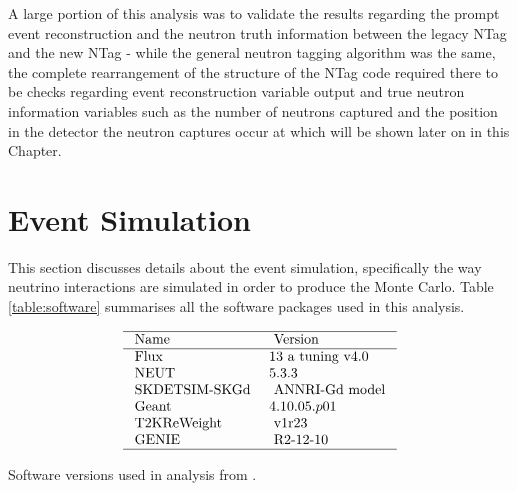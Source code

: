 A large portion of this analysis was to validate the results regarding the prompt event reconstruction and the neutron truth information between the legacy NTag and the new NTag - while the general neutron tagging algorithm was the same, the complete rearrangement of the structure of the NTag code required there to be checks regarding event reconstruction variable output and true neutron information variables such as the number of neutrons captured and the position in the detector the neutron captures occur at which will be shown later on in this Chapter. 

\section{Event Simulation}

This section discusses details about the event simulation, specifically the way neutrino interactions are simulated in order to produce the Monte Carlo. Table \ref{table:software} summarises all the software packages used in this analysis. 


\begin{table}
$$
\begin{array}{ll}
\hline \text { Name } & \text { Version } \\
\hline \text { Flux } & 13 \text { a tuning v4.0 } \\
\text { NEUT } & 5.3 .3 \\
\text { SKDETSIM-SKGd } & \text { ANNRI-Gd model } \\
\text { Geant } & 4.10.05.p01 \\
\text { T2KReWeight } & \text { v1r23 } \\
\text { GENIE } & \text { R2-12-10 } \\
\hline
\end{array}
$$
\caption{Software versions used in analysis from \cite{tn415_fiacob}.}
\label{table:software}
\end{table}


